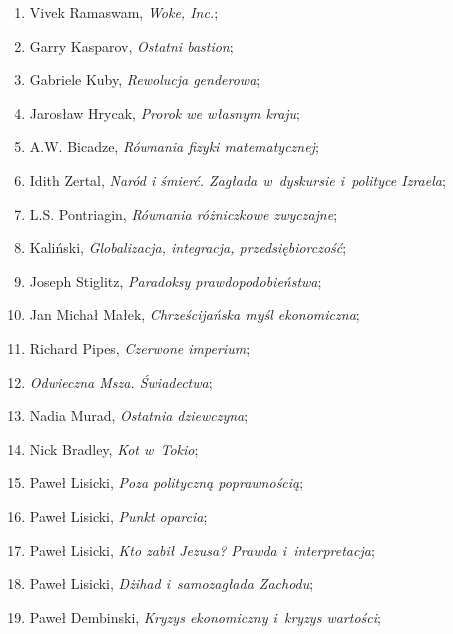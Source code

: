 \documentclass[a4paper,11pt]{article}
\begin{document}
\begin{enumerate}
\item Vivek Ramaswam, \textit{Woke, Inc.};

\item Garry Kasparov, \textit{Ostatni bastion};

\item Gabriele Kuby, \textit{Rewolucja genderowa};

\item Jarosław Hrycak, \textit{Prorok we własnym kraju};

\item A.W. Bicadze, \textit{Równania fizyki matematycznej};

\item Idith Zertal, \textit{Naród i śmierć. Zagłada w~dyskursie
    i~polityce Izraela};

\item L.S. Pontriagin, \textit{Równania różniczkowe zwyczajne};

\item Kaliński, \textit{Globalizacja, integracja, przedsiębiorczość};

\item Joseph Stiglitz, \textit{Paradoksy prawdopodobieństwa};

\item Jan Michał Małek, \textit{Chrześcijańska myśl ekonomiczna};

\item Richard Pipes, \textit{Czerwone imperium};

\item \textit{Odwieczna Msza. Świadectwa};

\item Nadia Murad, \textit{Ostatnia dziewczyna};

\item Nick Bradley, \textit{Kot w~Tokio};

\item Paweł Lisicki, \textit{Poza polityczną poprawnością};

\item Paweł Lisicki, \textit{Punkt oparcia};

\item Paweł Lisicki, \textit{Kto zabił Jezusa? Prawda i~interpretacja};

\item Paweł Lisicki, \textit{Dżihad i~samozagłada Zachodu};

\item Paweł Dembinski, \textit{Kryzys ekonomiczny i~kryzys wartości};


\end{enumerate}
\end{document}
